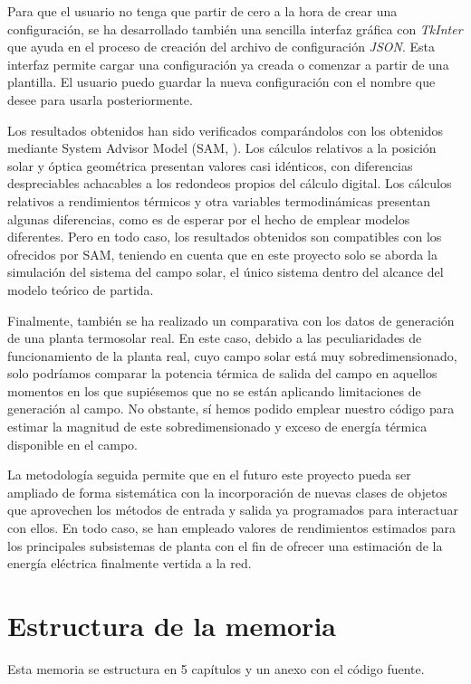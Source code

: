 Para que el usuario no tenga que partir de cero a la hora de crear una configuración, se ha desarrollado también una sencilla interfaz gráfica con \emph{TkInter} \cite{TkInterPythonWiki}  que ayuda en el proceso de creación del archivo de configuración \emph{JSON}. Esta interfaz permite cargar una configuración ya creada o comenzar a partir de una plantilla. El usuario puedo guardar la nueva configuración con el nombre que desee para usarla posteriormente.

Los resultados obtenidos han sido verificados comparándolos con los obtenidos mediante System Advisor Model (SAM, \cite{freemanSystemAdvisorModel2018}). Los cálculos relativos a la posición solar y óptica geométrica presentan valores casi idénticos, con diferencias despreciables achacables a los redondeos propios del cálculo digital. Los cálculos relativos a rendimientos térmicos y otra variables termodinámicas presentan algunas diferencias, como es de esperar por el hecho de emplear modelos diferentes. Pero en todo caso, los resultados obtenidos son compatibles con los ofrecidos por SAM, teniendo en cuenta que en este proyecto solo se aborda la simulación del sistema del campo solar, el único sistema dentro del alcance del modelo teórico de partida. 

Finalmente, también se ha realizado un comparativa con los datos de generación de una planta termosolar real. En este caso, debido a las peculiaridades de funcionamiento de la planta real, cuyo campo solar está muy sobredimensionado, solo podríamos comparar la potencia térmica de salida del campo en aquellos momentos en los que supiésemos que no se están aplicando limitaciones de generación al campo. No obstante, sí hemos podido emplear nuestro código para estimar la magnitud de este sobredimensionado y exceso de energía térmica disponible en el campo. 

La metodología seguida permite que en el futuro este proyecto pueda ser ampliado de forma sistemática con la incorporación de nuevas clases de objetos que aprovechen los métodos de entrada y salida ya programados para interactuar con ellos. En todo caso, se han empleado valores de rendimientos estimados para los principales subsistemas de planta con el fin de ofrecer una estimación de la energía eléctrica finalmente vertida a la red.


\section{Estructura de la memoria}
Esta memoria se estructura en 5 capítulos y un anexo con el código fuente.

